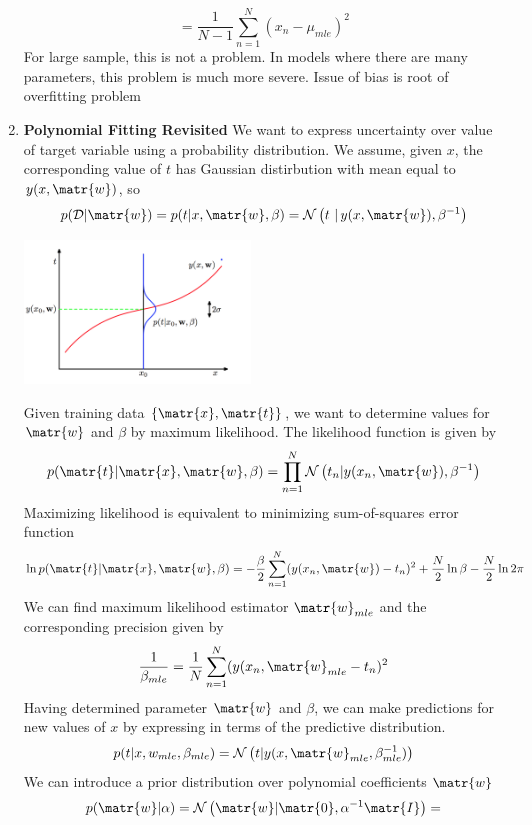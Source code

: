 \documentclass[11pt]{article}
\begin{document}
\begin{defn*}
\begin{enumerate}
\[            = \frac{1}{N-1}
            \sum_{n=1}^N (x_n - \mu_{mle})^2
        \]
        For large sample, this is not a problem. In models where there are many parameters, this problem is much more severe. Issue of bias is root of overfitting problem 
        \item \textbf{Polynomial Fitting Revisited} We want to express uncertainty over value of target variable using a probability distribution. We assume, given $x$, the corresponding value of $t$ has Gaussian distirbution with mean equal to $y(x,\matr{w})$, so 
        \[
            p(\mathcal{D}|\matr{w}) = 
            p(t|x,\matr{w},\beta) = 
            \normal{t \,\, |\, y(x,\matr{w}), \beta^{-1}}
        \]
        \begin{center}
            \includegraphics[width=6cm]{gaussian_conditional_poly_fitting.jpg}
        \end{center}
        Given training data $\{\matr{x}, \matr{t}\}$, we want to determine values for $\matr{w}$ and $\beta$ by maximum likelihood. The likelihood function is given by 
        \[
            p(\matr{t}|\matr{x}, \matr{w}, \beta) = 
            \prod_{n=1}^N \normal{t_n | y(x_n, \matr{w}), \beta^{-1}}    
        \]
        Maximizing likelihood is equivalent to minimizing sum-of-squares error function
        \[
            \ln{p(\matr{t}|\matr{x}, \matr{w}, \beta)}  
            = -\frac{\beta}{2} \sum_{n=1}^N (y(x_n, \matr{w}) - t_n)^2 + \frac{N}{2}\ln{\beta} -  \frac{N}{2} \ln{2\pi}  
        \]
        We can find maximum likelihood estimator $\matr{w}_{mle}$ and the corresponding precision given by 
        \[
            \frac{1}{\beta_{mle}} = \frac{1}{N}\sum_{n=1}^N (y(x_n, \matr{w}_{mle}  - t_n)^2
        \]
        Having determined parameter $\matr{w}$ and $\beta$, we can make predictions for new values of $x$ by expressing in terms of the predictive distribution. 
        \[
            p(t|x,w_{mle}, \beta_{mle})
            = 
            \normal{t|y(x,\matr{w}_{mle}, \beta^{-1}_{mle})}
        \]
        We can introduce a prior distribution over polynomial coefficients $\matr{w}$
        \[
            p(\matr{w}|\alpha) = 
            \normal{\matr{w}| \matr{0}, \alpha^{-1}\matr{I}} = 
\]
\end{enumerate}
\end{defn*}
\end{document}
